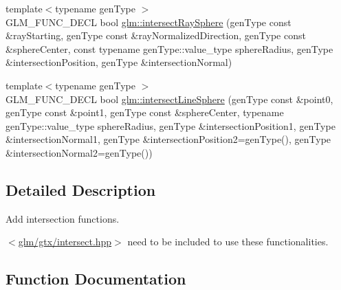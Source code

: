 \begin{DoxyCompactItemize}
{\footnotesize template$<$typename gen\+Type $>$ }\\G\+L\+M\+\_\+\+F\+U\+N\+C\+\_\+\+D\+E\+CL bool \hyperlink{group__gtx__intersect_gad28c00515b823b579c608aafa1100c1d}{glm\+::intersect\+Ray\+Sphere} (gen\+Type const \&ray\+Starting, gen\+Type const \&ray\+Normalized\+Direction, gen\+Type const \&sphere\+Center, const typename gen\+Type\+::value\+\_\+type sphere\+Radius, gen\+Type \&intersection\+Position, gen\+Type \&intersection\+Normal)
\item 
{\footnotesize template$<$typename gen\+Type $>$ }\\G\+L\+M\+\_\+\+F\+U\+N\+C\+\_\+\+D\+E\+CL bool \hyperlink{group__gtx__intersect_ga9c68139f3d8a4f3d7fe45f9dbc0de5b7}{glm\+::intersect\+Line\+Sphere} (gen\+Type const \&point0, gen\+Type const \&point1, gen\+Type const \&sphere\+Center, typename gen\+Type\+::value\+\_\+type sphere\+Radius, gen\+Type \&intersection\+Position1, gen\+Type \&intersection\+Normal1, gen\+Type \&intersection\+Position2=gen\+Type(), gen\+Type \&intersection\+Normal2=gen\+Type())
\end{DoxyCompactItemize}


\subsection{Detailed Description}
Add intersection functions. 

$<$\hyperlink{intersect_8hpp}{glm/gtx/intersect.\+hpp}$>$ need to be included to use these functionalities. 

\subsection{Function Documentation}
